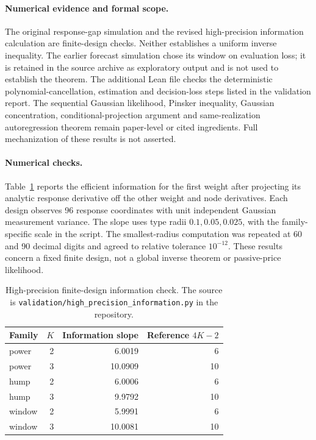 \documentclass[12pt]{article}
\theoremstyle{definition}
\theoremstyle{remark}
\begin{document}
\paragraph{Numerical evidence and formal scope.} The original response-gap simulation and the revised high-precision information calculation are finite-design checks. Neither establishes a uniform inverse inequality. The earlier forecast simulation chose its window on evaluation loss; it is retained in the source archive as exploratory output and is not used to establish the theorem. The additional Lean file checks the deterministic polynomial-cancellation, estimation and decision-loss steps listed in the validation report. The sequential Gaussian likelihood, Pinsker inequality, Gaussian concentration, conditional-projection argument and same-realization autoregression theorem remain paper-level or cited ingredients. Full mechanization of these results is not asserted.

\paragraph{Numerical checks.} Table~\ref{tab:revisionnumerics} reports the efficient information for the first weight after projecting its analytic response derivative off the other weight and node derivatives. Each design observes 96 response coordinates with unit independent Gaussian measurement variance. The slope uses type radii $0.1,0.05,0.025$, with the family-specific scale in the script. The smallest-radius computation was repeated at 60 and 90 decimal digits and agreed to relative tolerance $10^{-12}$. These results concern a fixed finite design, not a global inverse theorem or passive-price likelihood.
\begin{table}[ht]\centering
\begin{tabular}{lrrr}\toprule Family & $K$ & Information slope & Reference $4K-2$\\\midrule
power & 2 & 6.0019 & 6\\
power & 3 & 10.0909 & 10\\
hump & 2 & 6.0006 & 6\\
hump & 3 & 9.9792 & 10\\
window & 2 & 5.9991 & 6\\
window & 3 & 10.0081 & 10\\
\bottomrule\end{tabular}
\caption{High-precision finite-design information check. The source is \nolinkurl{validation/high_precision_information.py} in the repository.}\label{tab:revisionnumerics}\end{table}
\end{document}
